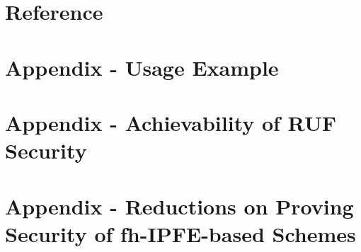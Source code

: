 

\section*{Reference}




\appendix
\backupbegin

\section{Appendix - Usage Example}
\hypertarget{sec:appendix-usage}{}


\section{Appendix - Achievability of RUF Security}
\hypertarget{sec:appendix-RUF}{}
\label{sec:appendix-A}


\section{Appendix - Reductions on Proving Security of fh-IPFE-based Schemes}
\hypertarget{sec:appendix-reduction}{}
\label{sec:appendix-B}

\backupend


